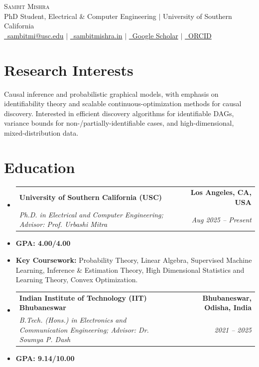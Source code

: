 \documentclass[10pt,letterpaper]{article}
\makeatletter
\newcommand{\resumeItem}[1]{
  \item\small{
    {#1 \vspace{-2pt}}
  }
}
\newcommand{\resumeSubheading}[4]{
  \vspace{-1pt}\item
    \begin{tabular*}{0.99\textwidth}[t]{l@{\extracolsep{\fill}}r}
      \textbf{#1} & \textbf{#2} \\
      \textit{\small#3} & \textit{\small #4} \\
    \end{tabular*}\vspace{-5pt}
}
\newcommand{\resumeSubHeadingListStart}{\begin{itemize}[leftmargin=*, label={}]}
\newcommand{\resumeSubHeadingListEnd}{\end{itemize}}
\makeatother
\begin{document}
\begin{center}
    {\Huge \scshape Sambit Mishra} \\ \vspace{2pt}
    \small PhD Student, Electrical \& Computer Engineering $|$ University of Southern California \\ \vspace{2pt}
    \href{mailto:sambitmi@usc.edu}{\faEnvelope \ sambitmi@usc.edu} $|$ \href{https://www.sambitmishra.in}{\faGlobe \ sambitmishra.in} $|$ \href{https://scholar.google.com/citations?user=kyCSMKUAAAAJ}{\faGraduationCap \ Google Scholar} $|$ \href{https://orcid.org/0000-0002-7736-7164}{\faOrcid \ ORCID}
\end{center}

\section{Research Interests}
\small{
Causal inference and probabilistic graphical models, with emphasis on identifiability theory and scalable continuous-optimization methods for causal discovery. Interested in efficient discovery algorithms for identifiable DAGs, variance bounds for non-/partially-identifiable cases, and high-dimensional, mixed-distribution data.
}
\vspace{-8pt}

\section{Education}
  \resumeSubHeadingListStart
    \resumeSubheading
      {University of Southern California (USC)}{Los Angeles, CA, USA}
      {Ph.D. in Electrical and Computer Engineering; Advisor: Prof. Urbashi Mitra}{Aug 2025 -- Present}
      \resumeItem{\textbf{GPA: 4.00/4.00}}
      \resumeItem{\textbf{Key Coursework:} Probability Theory, Linear Algebra, Supervised Machine Learning, Inference \& Estimation Theory, High Dimensional Statistics and Learning Theory, Convex Optimization.}

    \vspace{10pt}

    \resumeSubheading
      {Indian Institute of Technology (IIT) Bhubaneswar}{Bhubaneswar, Odisha, India}
      {B.Tech. (Hons.) in Electronics and Communication Engineering; Advisor: Dr. Soumya P. Dash}{2021 -- 2025}
      \resumeItem{\textbf{GPA: 9.14/10.00}}
  \resumeSubHeadingListEnd
\end{document}
